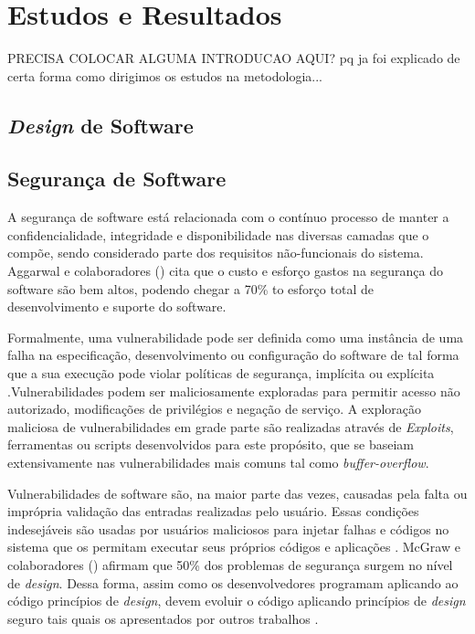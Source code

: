 \section{Estudos e Resultados}
\label{sec:studies}

PRECISA COLOCAR ALGUMA INTRODUCAO AQUI? pq ja foi explicado de certa forma como dirigimos os estudos na metodologia...

\subsection{\emph{Design} de Software}    
\subsection{Segurança de Software}

A segurança de software está relacionada com o contínuo processo de manter a confidencialidade, integridade e disponibilidade nas diversas camadas que o compõe, sendo considerado parte dos requisitos não-funcionais do sistema. Aggarwal e colaboradores (\cite{aggarwal2002}) cita que o custo e esforço gastos na segurança do software são bem altos, podendo chegar a 70\% to esforço total de desenvolvimento e suporte do software.

Formalmente, uma vulnerabilidade pode ser definida como uma instância de uma falha na especificação, desenvolvimento ou configuração do software de tal forma que a sua execução pode violar políticas de segurança, implícita ou explícita \cite{krsul1998}.Vulnerabilidades podem ser maliciosamente exploradas para permitir acesso não autorizado, modificações de privilégios e negação de serviço. A exploração maliciosa de vulnerabilidades em grade parte são realizadas através de \emph{Exploits}, ferramentas ou scripts desenvolvidos para este propósito, que se baseiam extensivamente nas vulnerabilidades mais comuns tal como \emph{buffer-overflow}. 

Vulnerabilidades de software são, na maior parte das vezes, causadas pela falta ou imprópria validação das entradas realizadas pelo usuário. Essas condições indesejáveis são usadas por usuários maliciosos para injetar falhas e códigos no sistema que os permitam executar seus próprios códigos e aplicações  \cite{jimenez2009}. McGraw e colaboradores (\cite{mcgraw2004}) afirmam que 50\% dos problemas de segurança surgem no nível de \emph{design}. Dessa forma, assim como os desenvolvedores programam aplicando ao código princípios de \emph{design}, devem evoluir o código aplicando princípios de \emph{design} seguro tais quais os apresentados por outros trabalhos \cite{saltzer1975} \cite{bishop2003} \cite{mcgraw2002} \cite{a1lshammari2009}.

